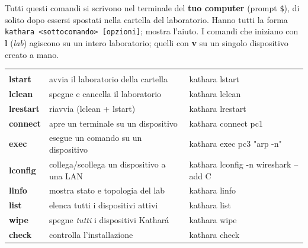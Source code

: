 
Tutti questi comandi si scrivono nel terminale del \textbf{tuo computer} (prompt \texttt{\$}), di solito dopo essersi spostati nella cartella del laboratorio. Hanno tutti la forma \texttt{kathara <sottocomando> [opzioni]};  mostra l'aiuto. I comandi che iniziano con \textbf{l} (\emph{lab}) agiscono su un intero laboratorio; quelli con \textbf{v} su un singolo dispositivo creato a mano.

\begin{center}
\begin{tabularx}{\linewidth}{>{\ttfamily\bfseries\color{navy}}l Y >{\ttfamily\small}l}
 &  & \\
lstart & avvia il laboratorio della cartella & kathara lstart\\
lclean & spegne e cancella il laboratorio & kathara lclean\\
lrestart & riavvia (lclean + lstart) & kathara lrestart\\
connect & apre un terminale su un dispositivo & kathara connect pc1\\
exec & esegue un comando su un dispositivo & kathara exec pc3 "arp -n"\\
lconfig & collega/scollega un dispositivo a una LAN & kathara lconfig -n wireshark --add C\\
linfo & mostra stato e topologia del lab & kathara linfo\\
list & elenca tutti i dispositivi attivi & kathara list\\
wipe & spegne \emph{tutti} i dispositivi Kathará & kathara wipe\\
check & controlla l'installazione & kathara check\\
\end{tabularx}
\end{center}

